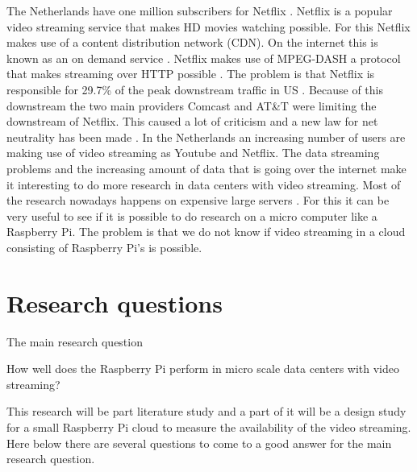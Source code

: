 \documentclass{sig-alternate-br}
\begin{document}
The Netherlands have one million subscribers for Netflix \cite{volkskrant}. Netflix is a popular video streaming service that makes HD movies watching possible. For this Netflix makes use of a content distribution network (CDN). On the internet this is known as an on demand service \cite{Adhikari:2012}. Netflix makes use of MPEG-DASH a protocol that makes streaming over HTTP possible \cite{martin:2013}. The problem is that Netflix is responsible for  29.7\% of the peak downstream traffic in US \cite{Adhikari:2012, computer-networking}. Because of this downstream the two main providers Comcast and  AT\&T were limiting the downstream of Netflix. This caused a lot of criticism and a new law for net neutrality has been made \cite{net-neutrality}. \newline
In the Netherlands an increasing number of users are making use of video streaming as Youtube and Netflix. The data streaming problems and the increasing amount of data that is going over the internet make it interesting to do more research in data centers with video streaming. Most of the research nowadays happens on expensive large servers \cite{tso:2013}. For this it can be very useful to see if it is possible to do research on a micro computer like a Raspberry Pi. The problem is that we do not know if video streaming in a cloud consisting of Raspberry Pi's is possible. 

\section{Research questions}
The main research question
\begin{center} 
How well does the Raspberry Pi perform in micro scale data centers with video streaming? 
\end{center}
This research will be part literature study and a part of it will be a design study for a small Raspberry Pi cloud to measure the availability of the video streaming. Here below there are several questions to come to a good answer for the main research question. 
\end{document}

